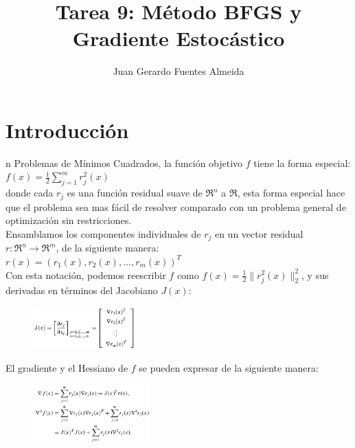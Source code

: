 \documentclass[10pt,journal,compsoc]{styles/IEEEtran}
\title{Tarea 9: M\'etodo BFGS y Gradiente Estoc\'astico}
\author{Juan Gerardo Fuentes Almeida}
\begin{document}
\maketitle

\IEEEdisplaynontitleabstractindextext

\IEEEpeerreviewmaketitle

\section{Introducci\'on}

n Problemas de Mínimos Cuadrados, la función objetivo $f$ tiene la forma especial:\\
 
 $f(x)=\frac{1}{2} \sum \limits_{j=1}^{m} r^2_j (x)$\\
 
donde cada $r_j$ es una función residual suave de $\Re^n$ a $\Re$, esta forma especial hace que el problema sea mas fácil de resolver comparado con un problema general de optimización sin restricciones.\\

Ensamblamos los componentes individuales de $r_j$ en un vector residual $r:\Re^n \rightarrow \Re^m$, de la siguiente manera:\\

$r(x)=(r_1(x),r_2(x),...,r_m(x))^T$\\

Con esta notación, podemos reescribir $f$ como $f(x)=\frac{1}{2} \parallel r^2_j (x) \parallel _2^2$, y sus derivadas en términos del Jacobiano $J(x)$:\\

\begin{figure}[hbtp]
\centering
\includegraphics[width=0.35\textwidth]{Jacobian.png}
\caption*{}
\end{figure}

El gradiente y el Hessiano de $f$ se pueden expresar de la siguiente manera:\\

\begin{figure}[hbtp]
\centering
\includegraphics[width=0.4\textwidth]{Hessian.png}
\caption*{}
\end{figure}
\end{document}

